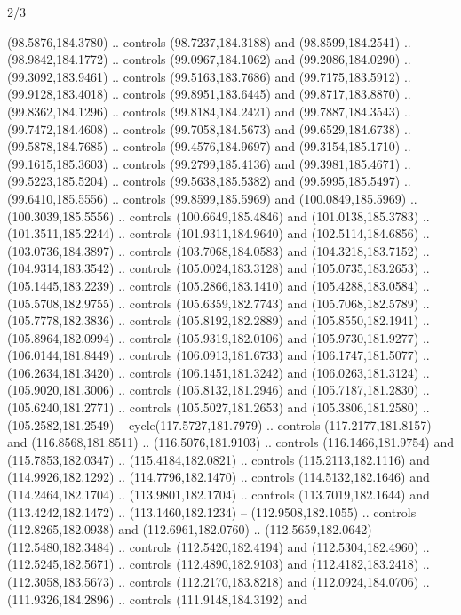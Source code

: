 \begin{flagdescription}{2/3}
\begin{scope}[shift={(0.5\flaglength,0.5)},scale=\flagwidth/320]
\begin{scope}[y=0.8pt, x=0.8pt, yscale=-1,shift={(-118.3,-146)}]
  (98.5876,184.3780) .. controls (98.7237,184.3188) and (98.8599,184.2541) ..
  (98.9842,184.1772) .. controls (99.0967,184.1062) and (99.2086,184.0290) ..
  (99.3092,183.9461) .. controls (99.5163,183.7686) and (99.7175,183.5912) ..
  (99.9128,183.4018) .. controls (99.8951,183.6445) and (99.8717,183.8870) ..
  (99.8362,184.1296) .. controls (99.8184,184.2421) and (99.7887,184.3543) ..
  (99.7472,184.4608) .. controls (99.7058,184.5673) and (99.6529,184.6738) ..
  (99.5878,184.7685) .. controls (99.4576,184.9697) and (99.3154,185.1710) ..
  (99.1615,185.3603) .. controls (99.2799,185.4136) and (99.3981,185.4671) ..
  (99.5223,185.5204) .. controls (99.5638,185.5382) and (99.5995,185.5497) ..
  (99.6410,185.5556) .. controls (99.8599,185.5969) and (100.0849,185.5969) ..
  (100.3039,185.5556) .. controls (100.6649,185.4846) and (101.0138,185.3783) ..
  (101.3511,185.2244) .. controls (101.9311,184.9640) and (102.5114,184.6856) ..
  (103.0736,184.3897) .. controls (103.7068,184.0583) and (104.3218,183.7152) ..
  (104.9314,183.3542) .. controls (105.0024,183.3128) and (105.0735,183.2653) ..
  (105.1445,183.2239) .. controls (105.2866,183.1410) and (105.4288,183.0584) ..
  (105.5708,182.9755) .. controls (105.6359,182.7743) and (105.7068,182.5789) ..
  (105.7778,182.3836) .. controls (105.8192,182.2889) and (105.8550,182.1941) ..
  (105.8964,182.0994) .. controls (105.9319,182.0106) and (105.9730,181.9277) ..
  (106.0144,181.8449) .. controls (106.0913,181.6733) and (106.1747,181.5077) ..
  (106.2634,181.3420) .. controls (106.1451,181.3242) and (106.0263,181.3124) ..
  (105.9020,181.3006) .. controls (105.8132,181.2946) and (105.7187,181.2830) ..
  (105.6240,181.2771) .. controls (105.5027,181.2653) and (105.3806,181.2580) ..
  (105.2582,181.2549) -- cycle(117.5727,181.7979) .. controls
  (117.2177,181.8157) and (116.8568,181.8511) .. (116.5076,181.9103) .. controls
  (116.1466,181.9754) and (115.7853,182.0347) .. (115.4184,182.0821) .. controls
  (115.2113,182.1116) and (114.9926,182.1292) .. (114.7796,182.1470) .. controls
  (114.5132,182.1646) and (114.2464,182.1704) .. (113.9801,182.1704) .. controls
  (113.7019,182.1644) and (113.4242,182.1472) .. (113.1460,182.1234) --
  (112.9508,182.1055) .. controls (112.8265,182.0938) and (112.6961,182.0760) ..
  (112.5659,182.0642) -- (112.5480,182.3484) .. controls (112.5420,182.4194) and
  (112.5304,182.4960) .. (112.5245,182.5671) .. controls (112.4890,182.9103) and
  (112.4182,183.2418) .. (112.3058,183.5673) .. controls (112.2170,183.8218) and
  (112.0924,184.0706) .. (111.9326,184.2896) .. controls (111.9148,184.3192) and

\end{scope}
\end{scope}
\end{flagdescription}

